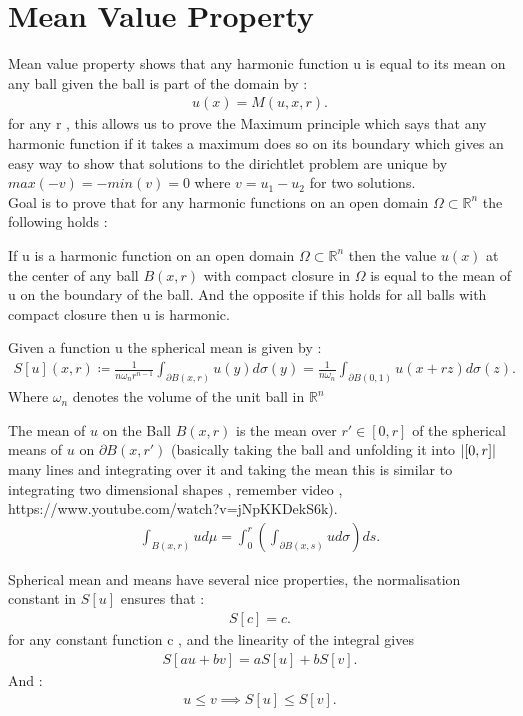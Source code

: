 \section{Mean Value Property } %
\label{sec:Mean Value Property }
Mean value property shows that any harmonic function u is equal to its mean on any ball given the ball is part of the domain by : 
\begin{align*}
  u(x) = M(u,x,r)
.\end{align*}
for any r , this allows us to prove the Maximum principle which says that any harmonic function if it takes a maximum does so on its boundary 
which gives an easy way to show that solutions to the dirichtlet problem are unique by $max(-v) = - min(v) = 0$ where $v = u_1-u_2$ for two solutions.\\[1ex]
Goal is to prove that for any harmonic functions on an open domain $\Omega  \subset  \mathbb{R}^{n } $ the following holds : 
\begin{definition}
  If u is a harmonic function on an open domain $\Omega  \subset  \mathbb{R}^{n } $ then the value  $u(x)$  at the center of any ball 
  $B(x,r)$ with compact closure in $\Omega $ is equal to the mean of u on the boundary of the ball. And the opposite 
  if this holds for all balls with compact closure then u is harmonic.
\end{definition}
\begin{definition}
  Given a function u the spherical mean is given by : 
  \begin{align*}
    S[u](x,r) \coloneqq  \frac{1}{n \omega_n r^{n-1 } }\int_{\partial B(x,r)} u(y) d\sigma(y) =  \frac{1}{n\omega_n} \int_{\partial B(0,1)} u(x+rz)d\sigma(z)
  .\end{align*}
  Where $\omega_n$ denotes the volume of the unit ball in $\mathbb{R}^{n } $
\end{definition}
The mean of $u$ on the Ball $B(x,r)$ is the mean over $r' \in  [0,r]$ of the spherical means of $u$ on $\partial B(x,r')$ (basically taking the ball and unfolding it into $\lvert[0,r]\rvert$ many lines and integrating over it and taking the mean 
this is similar to integrating two dimensional shapes , remember video , https://www.youtube.com/watch?v=jNpKKDekS6k). 
\begin{align*}
  \int_{B(x,r)} u d\mu  = \int_0^r (\int_{\partial B(x,s)} u d \sigma ) ds
.\end{align*}
\begin{corollary}
  Spherical mean and means have several nice properties, the normalisation constant in $S[u]$ ensures that : 
  \begin{align*}
    S[c] = c
  .\end{align*}
  for any constant function c , and the linearity of the integral gives 
  \begin{align*}
    S[au + bv] = a S[u] + bS[v]
  .\end{align*}
  And : 
  \begin{align*}
    u \le  v \implies S[u] \le S[v]
  .\end{align*}
\end{corollary}
